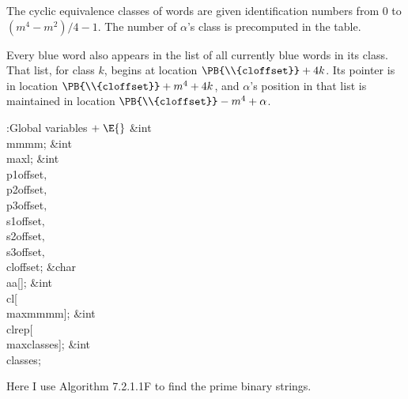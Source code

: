 The cyclic equivalence classes of words are given
identification numbers from
0 to $(m^4-m^2)/4-1$. The number of $\alpha$'s class is precomputed in
the  table.

Every blue word also appears in the list of all currently blue words
in its class. That list, for class $k$, begins at  location
$\PB{\\{cloffset}}+4k$. Its pointer is in  location
$\PB{\\{cloffset}}+m^4+4k$, and $\alpha$'s position in that list
is maintained in  location $\PB{\\{cloffset}}-m^4+\alpha$.

\Y\B\4:Global variables\X${}\mathrel+\E{}$\6
\&{int} \\{mmmm};\6
\&{int} \\{maxl};\6
\&{int} \\{p1offset}${},{}$ \\{p2offset}${},{}$ \\{p3offset}${},{}$ %
\\{s1offset}${},{}$ \\{s2offset}${},{}$ \\{s3offset}${},{}$ \\{cloffset};\6
\&{char} \\{aa}[];\6
\&{int} \\{cl}[\\{maxmmmm}];\6
\&{int} \\{clrep}[\\{maxclasses}];\6
\&{int} \\{classes};\par
\fi

Here I use Algorithm 7.2.1.1F to find the prime
binary strings.

